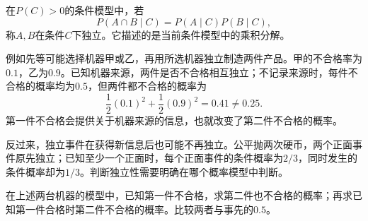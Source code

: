 在\(P(C)>0\)的条件模型中，若
\[
 P(A\cap B\mid C)=P(A\mid C)P(B\mid C),
\]
称\(A,B\)在条件\(C\)下独立。它描述的是当前条件模型中的乘积分解。

例如先等可能选择机器甲或乙，再用所选机器独立制造两件产品。甲的不合格率为\(0.1\)，乙为\(0.9\)。已知机器来源，两件是否不合格相互独立；不记录来源时，每件不合格的概率均为\(0.5\)，但两件都不合格的概率为
\[
 \frac12(0.1)^2+\frac12(0.9)^2=0.41\ne0.25.
\]
第一件不合格会提供关于机器来源的信息，也就改变了第二件不合格的概率。

反过来，独立事件在获得新信息后也可能不再独立。公平抛两次硬币，两个正面事件原先独立；已知至少一个正面时，每个正面事件的条件概率为\(2/3\)，同时发生的条件概率却为\(1/3\)。判断独立性需要明确在哪个概率模型中判断。

\begin{exercise}
在上述两台机器的模型中，已知第一件不合格，求第二件也不合格的概率；再求已知第一件合格时第二件不合格的概率。比较两者与事先的\(0.5\)。
\end{exercise}
